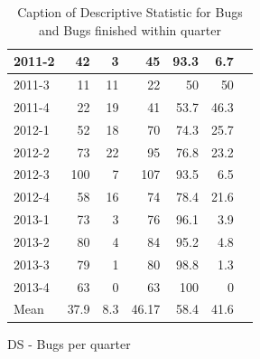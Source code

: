 \documentclass[UKenglish]{ifimaster}  %
\begin{document}
\begin{appendices}
\begin{table}[!htbp]
\begin{adjustwidth}{-3cm}{}
\begin{subfigure}[b]{0.4\textwidth}
{\begin{tabular}{ | l | r | r | r | r | r | r | }
2011-2 & 42 & 3 & 45 & 93.3 & 6.7 \\ \hline
2011-3 & 11 & 11 & 22 & 50 & 50 \\ \hline
2011-4 & 22 & 19 & 41 & 53.7 & 46.3 \\ \hline
2012-1 & 52 & 18 & 70 & 74.3 & 25.7 \\ \hline
2012-2 & 73 & 22 & 95 & 76.8 & 23.2 \\ \hline
2012-3 & 100 & 7 & 107 & 93.5 & 6.5 \\ \hline
2012-4 & 58 & 16 & 74 & 78.4 & 21.6 \\ \hline
2013-1 & 73 & 3 & 76 & 96.1 & 3.9 \\ \hline
2013-2 & 80 & 4 & 84 & 95.2 & 4.8 \\ \hline
2013-3 & 79 & 1 & 80 & 98.8 & 1.3 \\ \hline
2013-4 & 63 & 0 & 63 & 100 & 0 \\ \hline
Mean & 37.9 & 8.3 & 46.17 & 58.4& 41.6 \\ \hline
\end{tabular}
}
\caption{DS - Bugs per quarter}
 \label{DS:FTPQ:9}
\end{subfigure}
\end{adjustwidth}
\caption[Optional caption for list of figures]{Caption of Descriptive Statistic for Bugs and Bugs finished within quarter}
\label{DS:9:5} %
\end{table}


\end{appendices}
\end{document}
